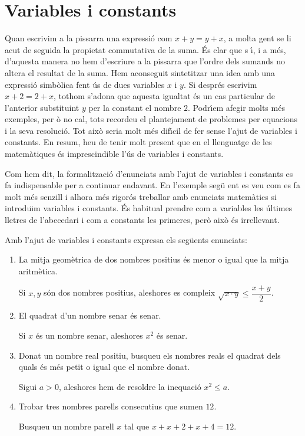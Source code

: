 

\section{Variables i constants}

Quan escrivim a la pissarra una expressi\'{o} com $x+y=y+x$, a molta gent se
li acut de seguida la propietat commutativa de la suma. \'{E}s clar que s%
\'{\i}, i a m\'{e}s, d'aquesta manera no hem d'escriure a la pissarra que
l'ordre dels sumands no altera el resultat de la suma. Hem aconseguit
sintetitzar una idea amb una expressi\'{o} simb\`{o}lica fent \'{u}s de dues
variables $x$ i $y$. Si despr\'{e}s escrivim $x+2=2+x$, tothom s'adona que
aquesta igualtat \'{e}s un cas particular de l'anterior substituint $y$ per
la constant el nombre $2$. Podr\'{\i}em afegir molts m\'{e}s exemples, per%
\`{o} no cal, tots recordeu el plantejament de problemes per equacions i la
seva resoluci\'{o}. Tot aix\`{o} seria molt m\'{e}s dif\'{\i}cil de fer
sense l'ajut de variables i constants. En resum, heu de tenir molt present
que en el llenguatge de les matem\`{a}tiques \'{e}s imprescindible l'\'{u}s
de variables i constants.

Com hem dit, la formalitzaci\'{o} d'enunciats amb l'ajut de variables i
constants es fa indispensable per a continuar endavant. En l'exemple seg\"{u}%
ent es veu com es fa molt m\'{e}s senzill i alhora m\'{e}s rigor\'{o}s
treballar amb enunciats matem\`{a}tics si introdu\"{\i}m variables i
constants. \'{E}s habitual prendre com a variables les \'{u}ltimes lletres
de l'abecedari i com a constants les primeres, per\`{o} aix\`{o} \'{e}s
irrellevant.

\begin{exem}
Amb l'ajut de variables i constants expressa els seg\"{u}ents enunciats:

\begin{enumerate}
\item La mitja geom\`{e}trica de dos nombres positius \'{e}s menor o igual
que la mitja aritm\`{e}tica.

Si $x,y$ s\'{o}n dos nombres positius, aleshores es compleix $\sqrt{x\cdot y}%
\leq\dfrac{x+y}{2}$.

\item El quadrat d'un nombre senar \'{e}s senar.

Si $x$ \'{e}s un nombre senar, aleshores \thinspace$x^{2}$ \'{e}s senar.

\item Donat un nombre real positiu, busqueu els nombres reals el quadrat
dels quals \'{e}s m\'{e}s petit o igual que el nombre donat.

Sigui $a>0$, aleshores hem de resoldre la inequaci\'{o} $x^{2}\leq a$.

\item Trobar tres nombres parells consecutius que sumen $12$.

Busqueu un nombre parell $x$ tal que $x+x+2+x+4=12$.
\end{enumerate}
\end{exem}


